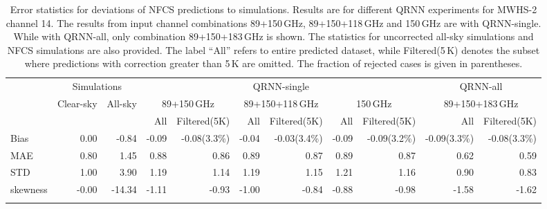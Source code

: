 \documentclass[amt, manuscript]{copernicus}
\begin{document}
\begin{table}[t]
	\caption{Error statistics for deviations of NFCS predictions to simulations. Results are for different QRNN experiments for MWHS-2 channel 14. The results from input channel combinations 89+150\,GHz, 89+150+118\,GHz and 150\,GHz are with QRNN-single. While with QRNN-all, only combination 89+150+183\,GHz is shown. The statistics for uncorrected all-sky simulations and NFCS simulations are also provided. The label ``All'' refers to entire predicted dataset, while Filtered(5\,K) denotes the subset where predictions with correction greater than 5\,K are omitted. The fraction of rejected cases is given in parentheses. }
	\label{tab:error_statistics_mwhs_14}
	\begin{tabular}{lrr|rr|rr|rr|rr}
		\tophline
		&\multicolumn{2}{c|}{Simulations}& \multicolumn{6}{c|}{QRNN-single} & \multicolumn{2}{c}{QRNN-all}\\
		\cline{2-11}
		&   Clear-sky &   All-sky &  \multicolumn{2}{c|}{89+150\,GHz} & \multicolumn{2}{c|}{89+150+118\,GHz} & \multicolumn{2}{c|}{150\,GHz} & \multicolumn{2}{c}{89+150+183\,GHz}\\
		&			   &			& All & Filtered(5K) & All & Filtered(5K) & All & Filtered(5K)  & All & Filtered(5K)\\
		\middlehline
		Bias      &  0.00 &  -0.84 & -0.09 & -0.08(3.3\%) & -0.04 & -0.03(3.4\%) & -0.09 & -0.09(3.2\%) & -0.09(3.3\%) & -0.08(3.3\%)  \\
		MAE       &  0.80 &   1.45 &  0.88 &  0.86 &  0.89 &  0.87 &  0.89 &  0.87 &  0.62 &  0.59\\
		STD       &  1.00 &   3.90 &  1.19 &  1.14 &  1.19 &  1.15 &  1.21 &  1.16 &  0.90 &  0.83\\
		skewness & -0.00 & -14.34 & -1.11 & -0.93 & -1.00 & -0.84 & -0.88 & -0.98 & -1.58 & -1.62\\
		\bottomhline
	\end{tabular}
\end{table}
\end{document}
